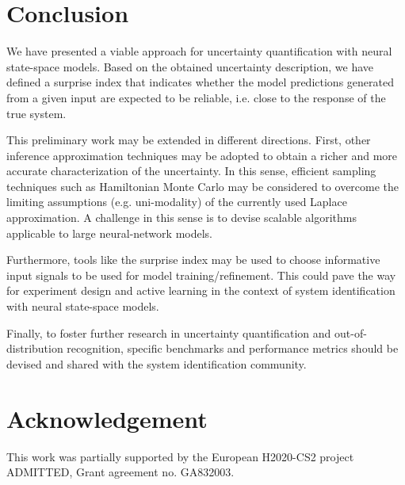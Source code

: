 \documentclass{article}
\begin{document}
\section{Conclusion}
We have presented a viable approach for uncertainty quantification with neural state-space models. Based on the obtained uncertainty description, we have defined a surprise index that indicates whether the model predictions generated from a given input are expected to be reliable, i.e. close to the response of the true system.

This preliminary work may be extended in different directions. First, other inference approximation techniques may be adopted to obtain a richer and more accurate characterization of the uncertainty. In this sense, efficient sampling techniques such as Hamiltonian Monte Carlo may be considered to overcome the limiting assumptions (e.g. uni-modality) of the currently used Laplace approximation. A challenge in this sense is to devise scalable algorithms applicable to large neural-network models.

Furthermore, tools like the surprise index may be used 
to {choose} informative input signals to be used for model training/refinement. 
This could pave the way for experiment design and active learning in the context of system identification with neural state-space models.

Finally, to foster further research in uncertainty quantification and out-of-distribution recognition, specific benchmarks and performance metrics should be devised and shared with the system identification community.


\section*{Acknowledgement}
This work was partially supported by the European H2020-CS2 project ADMITTED, Grant agreement no. GA832003.

                           
\end{document}
